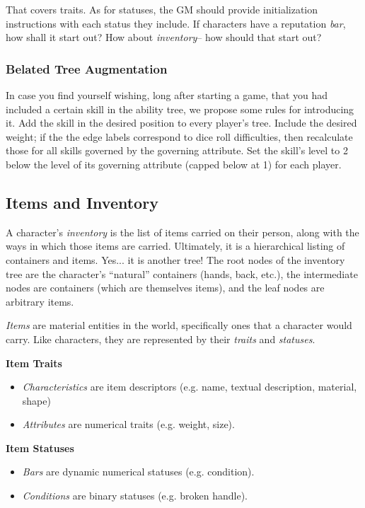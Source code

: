 \documentclass[12pt]{article}
\begin{document}
That covers traits. As for statuses,
the GM should provide initialization instructions with each status they include.
If characters have a reputation \emph{bar}, how shall it start out?
How about \emph{inventory}-- how should that start out?



\subsubsection{Belated Tree Augmentation}\label{sec:bta}

In case you find yourself wishing, long after starting a game,
that you had included a certain skill in the ability tree,
we propose some rules for introducing it.
Add the skill in the desired position to every player's tree.
Include the desired weight;
if the the edge labels correspond to dice roll difficulties, then recalculate those for all skills governed by the governing attribute.
Set the skill's level to 2 below the level of its governing attribute (capped below at 1) for each player.




\subsection{Items and Inventory} \label{sec:items}
A character's \emph{inventory} is the list of items carried on their person,
along with the ways in which those items are carried.
Ultimately, it is a hierarchical listing of containers and items.
Yes... it is another tree!
The root nodes of the inventory tree are the character's ``natural'' containers (hands, back, etc.),
the intermediate nodes are containers (which are themselves items),
and the leaf nodes are arbitrary items.

\emph{Items} are material entities in the world, 
specifically ones that a character would carry.
Like characters, they are represented by their \emph{traits} and \emph{statuses}.

\textbf{Item Traits}
\vspace{-1em}
\begin{itemize}
\item \emph{Characteristics} are item descriptors (e.g. name, textual description, material, shape)
\item \emph{Attributes} are numerical traits (e.g. weight, size).
\end{itemize}
\textbf{Item Statuses}
\vspace{-1em}
\begin{itemize}
\item \emph{Bars} are dynamic numerical statuses (e.g. condition).
\item \emph{Conditions} are binary statuses (e.g. broken handle).
\end{itemize}
\end{document}
